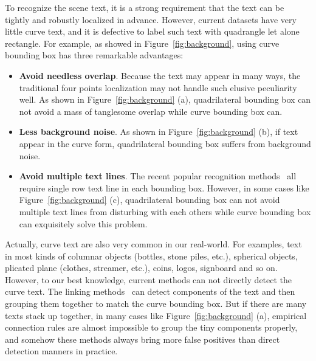 \documentclass[10pt,twocolumn,letterpaper]{article}
\begin{document}
To recognize the scene text, it is a strong requirement that the text can be tightly and robustly localized in advance. However, current datasets have very li{}ttle curve text, and it is defective to label such text with quadrangle let alone rectangle. For example, as showed in Figure~\ref{fig:background}, using curve bounding box has three remarkable advantages:
\begin{itemize}
  \item \textbf{Avoid needless overlap}. Because the text may appear in many ways, the traditional four points localization may not handle such elusive peculiarity well. As shown in Figure~\ref{fig:background} (a), quadrilateral bounding box can not avoid a mass of tanglesome overlap while curve bounding box can.
  \item \textbf{Less background noise}. As shown in Figure~\ref{fig:background} (b), if text appear in the curve form, quadrilateral bounding box suffers from background noise.
  \item \textbf{Avoid multiple text lines}. The recent popular recognition methods~\cite{shi2016robust,shi2016end,ablavatski2017enriched,lee2016recursive} all require single row text line in each bounding box. However, in some cases like Figure~\ref{fig:background} (c), quadrilateral bounding box can not avoid multiple text lines from disturbing with each others while curve bounding box can exquisitely solve this problem.
\end{itemize}

Actually, curve text are also very common in our real-world. For examples, text in most kinds of columnar objects (bottles, stone piles, etc.), spherical objects, plicated plane (clothes, streamer, etc.), coins, logos, signboard and so on. However, to our best knowledge, current methods can not directly detect the curve text. The linking methods~\cite{tian2016detecting,shi2017detecting,hu2017wordsup} can detect components of the text and then grouping them together to match the curve bounding box. But if there are many texts stack up together, in many cases like Figure~\ref{fig:background} (a), empirical connection rules are almost impossible to group the tiny components properly, and somehow these methods always bring more false positives than direct detection manners in practice.
\end{document}
